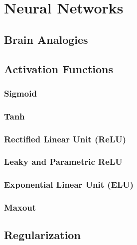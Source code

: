 	\section{Neural Networks} %

		\subsection{Brain Analogies} %

		\subsection{Activation Functions} %

			\subsubsection{Sigmoid} %

			\subsubsection{Tanh} %

			\subsubsection{Rectified Linear Unit (ReLU)} %

			\subsubsection{Leaky and Parametric ReLU} %

			\subsubsection{Exponential Linear Unit (ELU)} %

			\subsubsection{Maxout} %

		\subsection{Regularization} %

